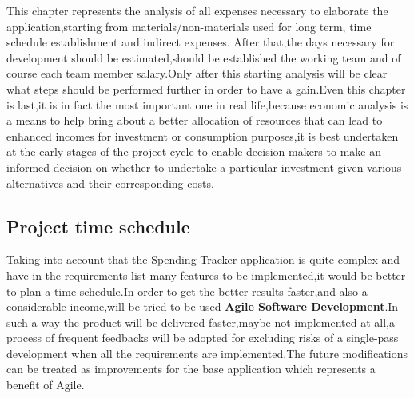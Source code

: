 This chapter represents the analysis of all expenses necessary to elaborate the application,starting from  materials/non-materials used for long term, time schedule establishment and indirect expenses. After that,the days necessary for development should be estimated,should be established the working team and of course each team member salary.Only after this starting analysis will be clear what steps should be performed further in order to have a gain.Even this chapter is last,it is in fact the most important one in real life,because economic analysis is a means to help bring about a better allocation of resources that can lead to enhanced incomes for investment or consumption purposes,it is best undertaken at the early stages of the project cycle to enable decision makers to make an informed decision on whether to undertake a particular investment given various alternatives and their corresponding costs.

\newpage
{}
\subsection{Project time schedule}
Taking into account that the Spending Tracker application is quite complex and have in the requirements list many features to be implemented,it would be better to plan a time schedule.In order to get the better results faster,and also a considerable income,will be tried to be used \textbf{Agile Software Development}.In such a way the product will be delivered faster,maybe not implemented at all,a process of frequent feedbacks will be adopted for excluding risks of a single-pass development when all the requirements are implemented.The future modifications can be treated as improvements for the base application which represents a benefit of Agile.
